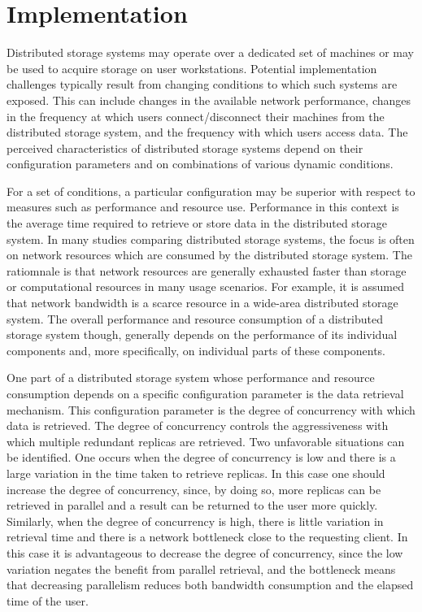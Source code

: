 \documentclass[11pt]{article}
\begin{document}
\section{Implementation}
Distributed storage systems may operate over a dedicated set of machines 
or may be used to acquire storage on user workstations. Potential 
implementation challenges typically result from changing conditions to 
which such systems are exposed. This can include changes in the 
available network performance, changes in the frequency at which users 
connect/disconnect their machines from the distributed storage system, 
and the frequency with which users access data. The perceived 
characteristics of distributed storage systems depend on their 
configuration parameters and on combinations of various dynamic 
conditions.

For a set of conditions, a particular configuration may be superior with 
respect to measures such as performance and resource use. Performance in 
this context is the average time required to retrieve or store data in the 
distributed storage system. In many studies comparing distributed storage 
systems, the focus is often on network resources which are consumed by the 
distributed storage system. The ratiomnale is that network resources are 
generally exhausted faster than storage or computational resources in many 
usage scenarios. For example, it is assumed that network bandwidth is a 
scarce resource in a wide-area distributed storage system. The overall 
performance and resource consumption of a distributed storage system though, 
generally depends on the performance of its individual components and, more 
specifically, on individual parts of these components.

One part of a distributed storage system whose performance and resource 
consumption depends on a specific configuration parameter is the data 
retrieval mechanism. This configuration parameter is the degree of 
concurrency with which data is retrieved. The degree of concurrency 
controls the aggressiveness with which multiple redundant replicas 
are retrieved. Two unfavorable situations can be identified. One occurs 
when the degree of concurrency is low and there is a large variation in 
the time taken to retrieve replicas. In this case one should increase the 
degree of concurrency, since, by doing so, more replicas can be retrieved 
in parallel and a result can be returned to the user more quickly. 
Similarly, when the degree of concurrency is high, there is little 
variation in retrieval time and there is a network bottleneck close to 
the requesting client. In this case it is advantageous to decrease the 
degree of concurrency, since the low variation negates the benefit from 
parallel retrieval, and the bottleneck means that decreasing parallelism 
reduces both bandwidth consumption and the elapsed time of the user.
\end{document}

